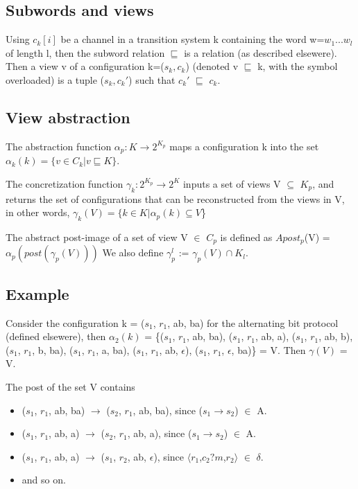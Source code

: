 \subsection{Subwords and views}

Using $c_k[i]$ be a channel in a transition system k containing the word w=$w_1...w_l$ of length l, then the subword relation $\sqsubseteq$ is a relation (as described elsewere). Then a view v of a configuration k=($s_k,c_k$) (denoted v $\sqsubseteq$ k, with the symbol overloaded) is a tuple ($s_k, c_k'$) such that $c_k'$ $\sqsubseteq$ $c_k$.

\subsection{View abstraction}
The abstraction function $\alpha_p: K\rightarrow 2^{K_p}$ maps a configuration k into the set $\alpha_k(k) = \{v\in C_k | v\sqsubseteq K\}$. 

The concretization function $\gamma_k: 2^{K_p} \rightarrow 2^K$ inputs a set of views V $\subseteq$ $K_p$, and returns the set of configurations that can be reconstructed from the views in V, in other words, $\gamma_k(V) = \{k \in K | \alpha_p(k) \subseteq V$\}

The abstract post-image of a set of view V $\in$ $C_p$ is defined as $Apost_p$(V) = $\alpha_p(post(\gamma_p(V)))$ We also define $\gamma_p^l$ := $\gamma_p(V) \cap K_l$.



\subsection{Example}
Consider the configuration k = ($s_1$, $r_1$, ab, ba) for the alternating bit protocol (defined elsewere), then $\alpha_2(k)$ = \{($s_1$, $r_1$, ab, ba), ($s_1$, $r_1$, ab, a), ($s_1$, $r_1$, ab, b), ($s_1$, $r_1$, b, ba), ($s_1$, $r_1$, a, ba), ($s_1$, $r_1$, ab, $\epsilon$), ($s_1$, $r_1$, $\epsilon$, ba)\} = V. Then $\gamma(V)$ = V.

The post of the set V contains
\begin{itemize}
\item
($s_1$, $r_1$, ab, ba) $\rightarrow$ ($s_2$, $r_1$, ab, ba), since ($s_1$$\rightarrow$$s_2$) $\in$ A.
\item
($s_1$, $r_1$, ab, a) $\rightarrow$ ($s_2$, $r_1$, ab, a), since ($s_1$$\rightarrow$$s_2$) $\in$ A.
\item
($s_1$, $r_1$, ab, a) $\rightarrow$ ($s_1$, $r_2$, ab, $\epsilon$), since $\langle$$r_1$,$c_2?m$,$r_2$$\rangle$ $\in$ $\delta$.
\item
and so on.
\end{itemize}
